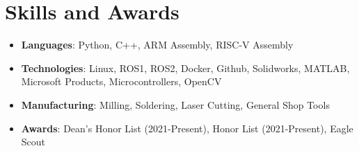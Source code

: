 \documentclass[letterpaper,10pt]{article}
\makeatletter
\newcommand{\resumeItem}[2]{
  \item\small{
    \textbf{#1}{: #2 \vspace{-2pt}}
  }
}
\newcommand{\resumeSubheading}[4]{
  \vspace{-1pt}\item
    \begin{tabular*}{0.97\textwidth}{l@{\extracolsep{\fill}}r}
      \textbf{#1} & \textbf{#2} \\
      \textit{#3} & \textit{#4} \\
    \end{tabular*}\vspace{-5pt}
}
\newcommand{\resumeSubItem}[2]{\resumeItem{#1}{#2}\vspace{-3pt}}
\newcommand{\resumeSubHeadingListStart}{\begin{itemize}[leftmargin=*]}
\newcommand{\resumeSubHeadingListEnd}{\end{itemize}}
\makeatother
\begin{document}
\section{Skills and Awards}
	\resumeSubHeadingListStart
        \resumeSubItem{Languages}{Python, C++, ARM Assembly, RISC-V Assembly} %
        \resumeSubItem{Technologies}{Linux, ROS1, ROS2, Docker, Github, Solidworks, MATLAB, Microsoft Products, Microcontrollers, OpenCV} %
        \resumeSubItem{Manufacturing}{Milling, Soldering, Laser Cutting, General Shop Tools}
        \resumeSubItem{Awards}{Dean's Honor List (2021-Present), Honor List (2021-Present), Eagle Scout}
    \resumeSubHeadingListEnd
\vspace{-5pt}


\end{document}
